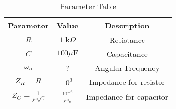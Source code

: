 \begin{table}[ht]
  \centering
    \begin{tabular}{|c|c|c|}
        \hline
	   \textbf{ Parameter} & \textbf{Value} & \textbf{Description} \\
	       \hline
	           $R$ & $1\text{ k}\Omega$ & Resistance \\
		       \hline
		           $C$ & $100\mu\text{F}$ & Capacitance \\
			       \hline
			           $\omega_o$ & ? & Angular Frequency  \\
				       \hline
				           $Z_R = R$ & $10^3$ & Impedance for resistor  \\
					       \hline
					           $Z_C = \frac{1}{j\omega_o C}$ & $\frac{10^{-6}}{j\omega_o}$ & Impedance for capacitor  \\
						       \hline
						         \end{tabular}
							   \vspace{2mm}
							     \caption{Parameter Table}
							       \label{BM_23_32}
							       \end{table}
